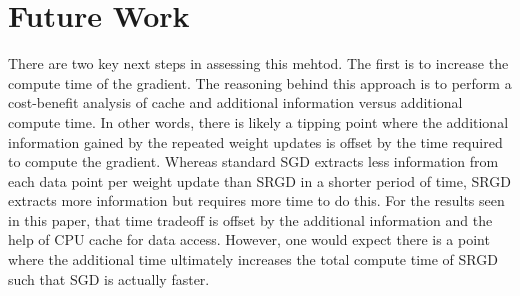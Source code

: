 \documentclass[conference,compsoc]{IEEEtran}
\begin{document}
%






\section{Future Work}
There are two key next steps in assessing this mehtod. The first
is to increase the compute time of the gradient. The reasoning behind
this approach is to perform a cost-benefit analysis of cache and
additional information versus additional compute time. In other words,
there is likely a tipping point where the additional information gained
by the repeated weight updates is offset by the time required to compute
the gradient. Whereas standard SGD extracts less information from
each data point per weight update than SRGD in a shorter period of time,
SRGD extracts more information but requires more time to do this. For the
results seen in this paper, that time tradeoff is offset by the additional
information and the help of CPU cache for data access. However, one would
expect there is a point where the additional time ultimately increases
the total compute time of SRGD such that SGD is actually faster.
\end{document}
